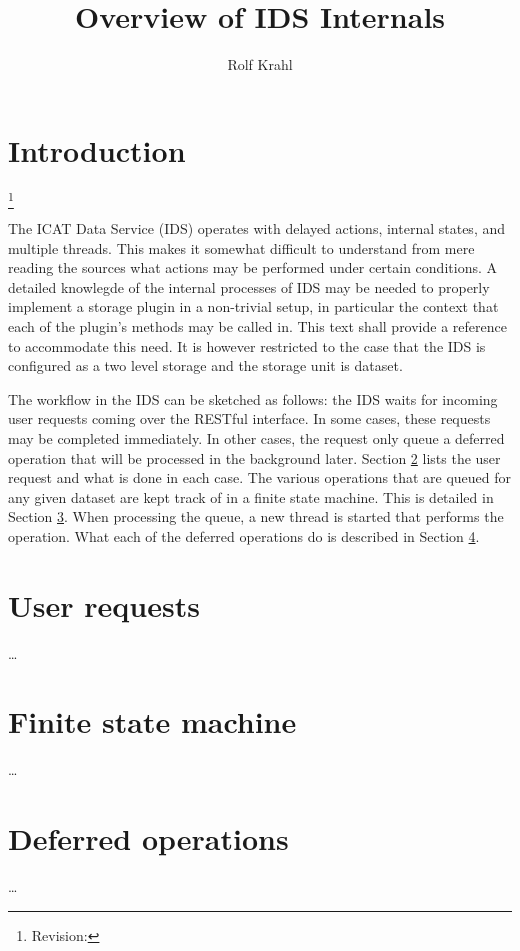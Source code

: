 \documentclass[paper=a4]{scrartcl}
\title{Overview of IDS Internals}
\author{Rolf Krahl}
\newcommand{\revhint}{%
  \begingroup%
  \let\thefootnote\relax%
  \footnote{Revision: }%
  \addtocounter{footnote}{-1}%
  \endgroup%
}
\begin{document}
\maketitle

\section{Introduction}

\revhint{}%
The ICAT Data Service (IDS) operates with delayed actions, internal
states, and multiple threads.  This makes it somewhat difficult to
understand from mere reading the sources what actions may be performed
under certain conditions.  A detailed knowlegde of the internal
processes of IDS may be needed to properly implement a storage plugin
in a non-trivial setup, in particular the context that each of the
plugin's methods may be called in.  This text shall provide a
reference to accommodate this need.  It is however restricted to the
case that the IDS is configured as a two level storage and the storage
unit is dataset.

The workflow in the IDS can be sketched as follows: the IDS waits for
incoming user requests coming over the RESTful interface.  In some
cases, these requests may be completed immediately.  In other cases,
the request only queue a deferred operation that will be processed in
the background later.  Section \ref{sec:requests} lists the user
request and what is done in each case.  The various operations that
are queued for any given dataset are kept track of in a finite state
machine.  This is detailed in Section \ref{sec:fsm}.  When processing
the queue, a new thread is started that performs the operation.  What
each of the deferred operations do is described in Section
\ref{sec:defops}.


\section{User requests}
\label{sec:requests}

\ldots


\section{Finite state machine}
\label{sec:fsm}

\ldots


\section{Deferred operations}
\label{sec:defops}

\ldots
\end{document}
